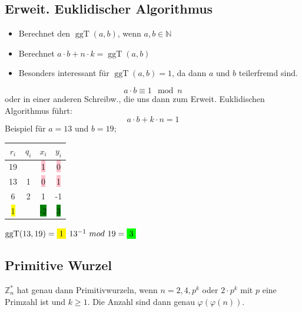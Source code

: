 \documentclass[8pt,a4paper,landscape]{article}
\begin{document}
\begin{multicols}{4}
\subsection{Erweit. Euklidischer Algorithmus}
\begin{itemize}
\item Berechnet den \(\operatorname{ggT}(a,{}b)\), wenn $a,b \in \mathbb{N}$
\item Berechnet \(a \cdot b + n \cdot k = \operatorname{ggT}(a,{}b)\)
\item Besonders interessant für \(\operatorname{ggT}(a,{}b)=1\), da dann \(a\) und \(b\) teilerfremd sind.
\end{itemize}
\[a \cdot b \equiv 1 \mod n\]
oder in einer anderen Schreibw., die uns dann zum Erweit. Euklidischen Algorithmus führt:
\[a \cdot b + k \cdot n = 1\]
Beispiel für $a=13$ und $b=19$;
\begin{center} 
\begin{tabular}{ c c c c }
$r_i$ & $q_i$ & $x_i$ & $y_i$ \\
\hline
19 &  & \colorbox{pink}{1} & \colorbox{pink}{0} \\
13 & 1 & \colorbox{pink}{0} & \colorbox{pink}{1} \\
6 & 2 & 1 & -1 \\
\colorbox{yellow}{1} &  & \colorbox{green}{-2} & \colorbox{green}{3}\\
\end{tabular}
\end{center}
$\operatorname{ggT}(13, 19) = \colorbox{yellow}{1}$ \hfill $13^{-1}~mod~19=\colorbox{green}{3}$

\subsection{Primitive Wurzel}
\(\mathbb{Z}_{n}^{*}\) hat genau dann Primitivwurzeln,  wenn 
\(n = 2,4, p^{k}\) oder \(2 \cdot p^{k}\) mit \(p\) eine Primzahl ist und \(k \geq 1\). Die Anzahl sind dann genau \(\varphi(\varphi(n))\).


\end{multicols}
\end{document}
